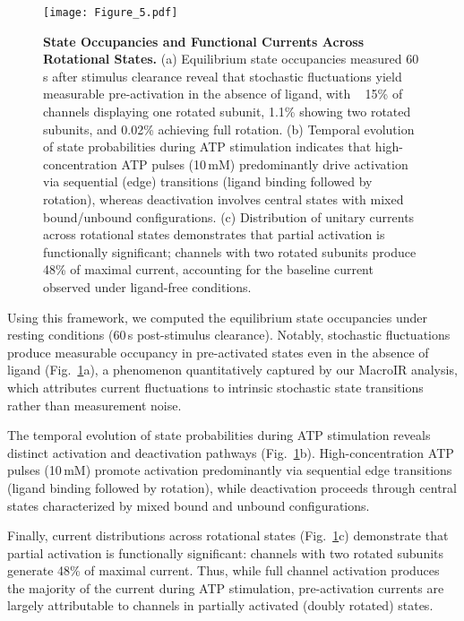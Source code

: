 \documentclass[pdflatex,sn-nature]{sn-jnl}%
\begin{document}
\begin{figure}[t]
	\centering
	\texttt{[image: Figure\_5.pdf]}
	\caption{\textbf{State Occupancies and Functional Currents Across Rotational States.} (a) Equilibrium state occupancies measured 60\,s after stimulus clearance reveal that stochastic fluctuations yield measurable pre-activation in the absence of ligand, with ~ 15\%  of channels displaying one rotated subunit, 1.1\%  showing two rotated subunits, and 0.02\%  achieving full rotation. (b) Temporal evolution of state probabilities during ATP stimulation indicates that high-concentration ATP pulses (10\,mM) predominantly drive activation via sequential (edge) transitions (ligand binding followed by rotation), whereas deactivation involves central states with mixed bound/unbound configurations. (c) Distribution of unitary currents across rotational states demonstrates that partial activation is functionally significant; channels with two rotated subunits produce 48\% of maximal current, accounting for the baseline current observed under ligand-free conditions.}
	\label{fig:SchemeX_states}
\end{figure}

Using this framework, we computed the equilibrium state occupancies under resting conditions (60\,s post-stimulus clearance). Notably, stochastic fluctuations produce measurable occupancy in pre-activated states even in the absence of ligand (Fig.~\ref{fig:SchemeX_states}a), a phenomenon quantitatively captured by our MacroIR analysis, which attributes current fluctuations to intrinsic stochastic state transitions rather than measurement noise.

The temporal evolution of state probabilities during ATP stimulation reveals distinct activation and deactivation pathways (Fig.~\ref{fig:SchemeX_states}b). High-concentration ATP pulses (10\,mM) promote activation predominantly via sequential edge transitions (ligand binding followed by rotation), while deactivation proceeds through central states characterized by mixed bound and unbound configurations.

Finally, current distributions across rotational states (Fig.~\ref{fig:SchemeX_states}c) demonstrate that partial activation is functionally significant: channels with two rotated subunits generate 48\% of maximal current. Thus, while full channel activation produces the majority of the current during ATP stimulation, pre-activation currents are largely attributable to channels in partially activated (doubly rotated) states.
\end{document}
